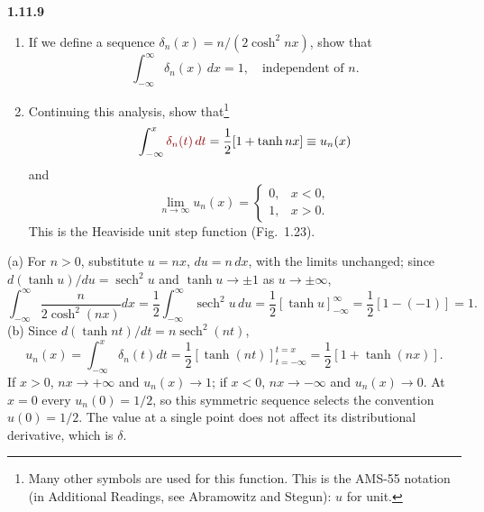 \par\bigskip
\noindent\textbf{1.11.9}\quad
\begin{enumerate}
\item[(a)] If we define a sequence $\delta_{n}(x)=n/(2\cosh^{2}nx)$, show that
  \[
  \int_{-\infty}^{\infty}\delta_{n}(x)\,dx=1,\quad\text{independent of }n.
  \]
\item[(b)] Continuing this analysis, show that\footnote{Many other symbols are
  used for this function. This is the AMS-55 notation (in Additional Readings,
  see Abramowitz and Stegun): $u$ for unit.}
  \[
  \int_{-\infty}^{x}\erratum{\delta_{n}(t)\,dt}=\frac{1}{2}[1+\tanh nx]\equiv u_{n}(x)
  \]
  and
  \[
  \lim_{n\to\infty}u_{n}(x)=\begin{cases}0,&x<0,\\1,&x>0.\end{cases}
  \]
  This is the Heaviside unit step function (Fig.~1.23).
\end{enumerate}
\solution
(a) For $n>0$, substitute $u=nx$, $du=n\,dx$, with the limits
unchanged; since $d(\tanh u)/du=\operatorname{sech}^2u$ and
$\tanh u\to\pm1$ as $u\to\pm\infty$,
\[
 \int_{-\infty}^\infty\frac{n}{2\cosh^2(nx)}dx
 =\frac12\int_{-\infty}^\infty\operatorname{sech}^2u\,du
 =\frac12[\tanh u]_{-\infty}^\infty=\frac12[1-(-1)]=1.
\]
(b)  Since
$d(\tanh nt)/dt=n\operatorname{sech}^2(nt)$,
\[
 u_n(x)=\int_{-\infty}^x\delta_n(t)dt
       =\frac12[\tanh(nt)]_{t=-\infty}^{t=x}
       =\frac12[1+\tanh(nx)].
\]
If $x>0$, $nx\to+\infty$ and $u_n(x)\to1$; if $x<0$,
$nx\to-\infty$ and $u_n(x)\to0$. At $x=0$ every $u_n(0)=1/2$,
so this symmetric sequence selects the convention $u(0)=1/2$.
The value at a single point does not affect its distributional derivative,
which is $\delta$.

